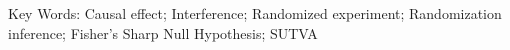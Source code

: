 

\begin{titlepage}
\maketitle


\begin{abstract} 

\end{abstract}

Key Words: Causal effect; Interference; Randomized experiment;
Randomization inference; Fisher's Sharp Null Hypothesis; SUTVA

\end{titlepage}
